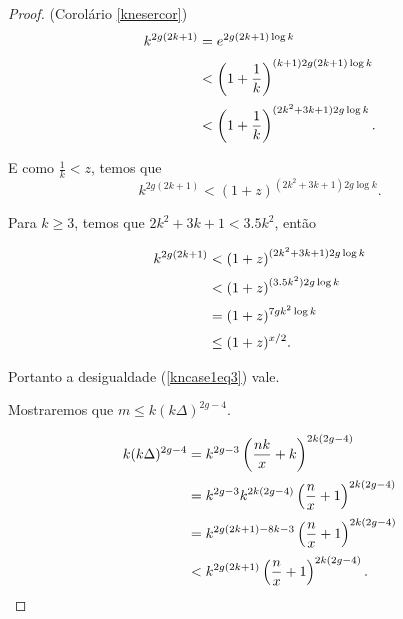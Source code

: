 \begin{proof}{(Corolário \ref{knesercor})}
\begin{equation*}
\setlength{\jot}{5pt}
\begin{aligned}
k^{2g(2k+1)} & = e^{2g(2k+1)\log k}\\
&< \left(1+\frac{1}{k}\right)^{(k+1)2g(2k+1)\log k}\\
&< \left(1+\frac{1}{k}\right)^{(2k^2+3k+1)2g\log k}.\\
\end{aligned}
\end{equation*}

E como $\frac{1}{k} < z$, temos que \[k^{2g(2k+1)} < \left(1+z\right)^{(2k^2+3k+1)2g\log k}.\]

Para $k \geq 3$, temos que $2k^2+3k+1<3.5k^2$, então 

\begin{equation*}
\setlength{\jot}{5pt}
\begin{aligned}
k^{2g(2k+1)} &< \left(1+z\right)^{(2k^2+3k+1)2g\log k}\\
&< \left(1+z\right)^{(3.5k^2)2g\log k}\\
&= (1+z)^{7gk^2\log k} \\
&\leq (1+z)^{x/2}.
\end{aligned}
\end{equation*}

Portanto a desigualdade (\ref{kncase1eq3}) vale.

Mostraremos que $m \leq k(k\Delta)^{2g-4}$.


\begin{equation*}
\setlength{\jot}{5pt}
\begin{aligned}
k(k\Delta)^{2g-4} & = k^{2g-3}\left(\frac{nk}{x}+k\right)^{2k(2g-4)} \\
 & = k^{2g-3}k^{2k(2g-4)}\left(\frac{n}{x}+1\right)^{2k(2g-4)} \\
 & = k^{2g(2k+1) - 8k - 3}\left(\frac{n}{x}+1\right)^{2k(2g-4)}\\
 & < k^{2g(2k+1)}\left(\frac{n}{x}+1\right)^{2k(2g-4)}.
\end{aligned}
\end{equation*}



\end{proof}

